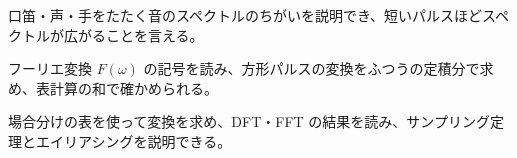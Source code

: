 \begin{furikaeri}
\begin{checklist}
\item 口笛・声・手をたたく音のスペクトルのちがいを説明でき、短いパルスほどスペクトルが広がることを言える。
\item フーリエ変換 $F(\omega)$ の記号を読み、方形パルスの変換をふつうの定積分で求め、表計算の和で確かめられる。
\item 場合分けの表を使って変換を求め、DFT・FFT の結果を読み、サンプリング定理とエイリアシングを説明できる。
\end{checklist}
\end{furikaeri}

